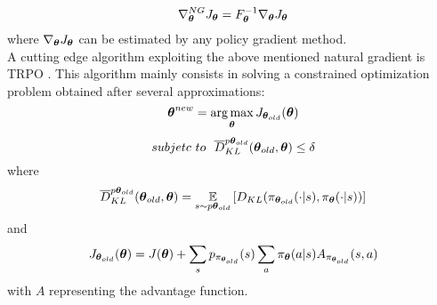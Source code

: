 \[
\ \nabla_{\boldsymbol{\theta}}^{NG} J_{\boldsymbol{\theta}}=F^{-1}_{\boldsymbol{\theta}} \nabla_{\boldsymbol{\theta}} J_{\boldsymbol{\theta}}
\]
where $\nabla_{\boldsymbol{\theta}} J_{\boldsymbol{\theta}}$ can be estimated by any policy gradient method.
\\
A cutting edge algorithm exploiting the above mentioned natural gradient is \ac{TRPO} \citep{schulman2015trust}. This algorithm mainly consists in solving a constrained optimization problem obtained after several approximations:
\[
\ \vtheta^{new}=\argmax_{\vtheta}J_{\vtheta_{old}}(\vtheta)
\]
\[
\ subjetc~to~~ \overline{D}_{KL}^{p\boldsymbol{\theta}_{old}}(\boldsymbol{\theta}_{old},\boldsymbol{\theta})\le\delta
\]
where \[
\ \overline{D}_{KL}^{p\vtheta_{old}}(\vtheta_{old},\vtheta)=\EVV[s \sim p\vtheta_{old}]{D_{KL}(\pi_{\vtheta_{old}}(\cdot|s),\pi_{\vtheta}(\cdot|s))}
\]
and \[
\ J_{\boldsymbol{\theta}_{old}}(\boldsymbol{\theta})= J(\boldsymbol{\theta})+\sum_{s}p_{\pi_{\boldsymbol{\theta}_{old}}}(s)\sum_{a}\pi_{\boldsymbol{\theta}}(a|s)A_{\pi_{\boldsymbol{\theta}_{old}}}(s,a)
\]
with $A$ representing the advantage function.
\vspace{-0.05in}

